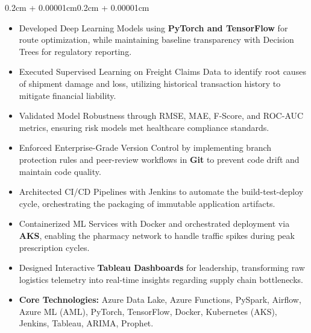 \documentclass{article}
\newenvironment{highlights}{
    \begin{itemize}[
        topsep=0.10cm, 
        parsep=0.08cm, 
        partopsep=0pt, 
        itemsep=0.08cm, 
        leftmargin=0.4cm + 10pt
    ]
}{
    \end{itemize}
}
\newenvironment{onecolentry}{
    \begin{adjustwidth}{0.2cm + 0.00001cm}{0.2cm + 0.00001cm}
}{
    \end{adjustwidth}
}
\begin{document}
\begin{onecolentry}
\begin{highlights}
        \item Developed Deep Learning Models using \textbf{PyTorch and TensorFlow} for route optimization, while maintaining baseline transparency with Decision Trees for regulatory reporting.
        \item Executed Supervised Learning on Freight Claims Data to identify root causes of shipment damage and loss, utilizing historical transaction history to mitigate financial liability.
        \item Validated Model Robustness through RMSE, MAE, F-Score, and ROC-AUC metrics, ensuring risk models met healthcare compliance standards.
        \item Enforced Enterprise-Grade Version Control by implementing branch protection rules and peer-review workflows in \textbf{Git} to prevent code drift and maintain code quality.
        \item Architected CI/CD Pipelines with Jenkins to automate the build-test-deploy cycle, orchestrating the packaging of immutable application artifacts.
        \item Containerized ML Services with Docker and orchestrated deployment via \textbf{AKS}, enabling the pharmacy network to handle traffic spikes during peak prescription cycles.
        \item Designed Interactive \textbf{Tableau Dashboards} for leadership, transforming raw logistics telemetry into real-time insights regarding supply chain bottlenecks.
        \item \textbf{Core Technologies:} Azure Data Lake, Azure Functions, PySpark, Airflow, Azure ML (AML), PyTorch, TensorFlow, Docker, Kubernetes (AKS), Jenkins, Tableau, ARIMA, Prophet.
    \end{highlights}
\end{onecolentry}

\vspace{0.3cm}
\end{document}
